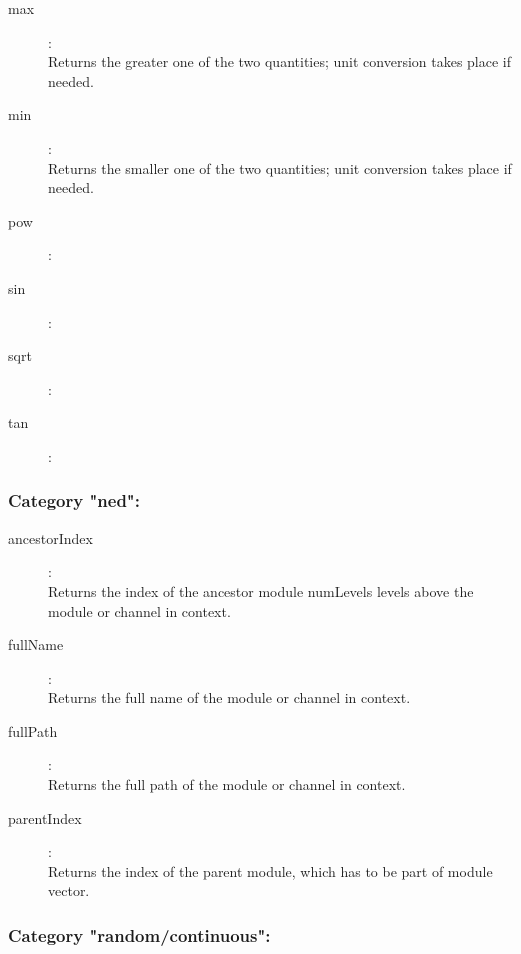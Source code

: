 \begin{description}
\item[max]:  \\
    Returns the greater one of the two quantities; unit conversion takes place if needed.
\item[min]:  \\
    Returns the smaller one of the two quantities; unit conversion takes place if needed.
\item[pow]:  \\
\item[sin]:  \\
\item[sqrt]:  \\
\item[tan]:  \\

\end{description}

\subsubsection{Category "ned":}

\begin{description}
\item[ancestorIndex]:  \\
    Returns the index of the ancestor module numLevels levels above the module or channel in context.
\item[fullName]:  \\
    Returns the full name of the module or channel in context.
\item[fullPath]:  \\
    Returns the full path of the module or channel in context.
\item[parentIndex]:  \\
    Returns the index of the parent module, which has to be part of module vector.

\end{description}

\subsubsection{Category "random/continuous":}

